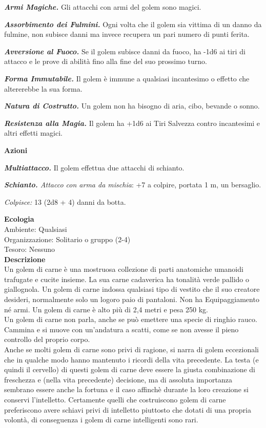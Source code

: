 \begin{multicols}{2}
\emph{\textbf{Armi Magiche.}} Gli attacchi con armi del golem sono magici.

\emph{\textbf{Assorbimento dei Fulmini.}} Ogni volta che il golem sia vittima di un danno da fulmine, non subisce danni ma invece recupera un pari numero di punti ferita.

\emph{\textbf{Avversione al Fuoco.}} Se il golem subisce danni da fuoco, ha -1d6 ai tiri di attacco e le prove di abilità fino alla fine del suo prossimo turno.

\emph{\textbf{Forma Immutabile.}} Il golem è immune a qualsiasi incantesimo o effetto che altererebbe la sua forma.

\emph{\textbf{Natura di Costrutto.}} Un golem non ha bisogno di aria, cibo, bevande o sonno.

\emph{\textbf{Resistenza alla Magia.}} Il golem ha +1d6 ai Tiri Salvezza contro incantesimi e altri effetti magici.

\textbf{Azioni}

\emph{\textbf{Multiattacco.}} Il golem effettua due attacchi di
schianto.

\emph{\textbf{Schianto.} Attacco con arma da mischia}: +7 a colpire,
portata 1 m, un bersaglio.

\emph{Colpisce:} 13 (2d8 + 4) danni da botta.

\textbf{Ecologia}\\
Ambiente: Qualsiasi\\
Organizzazione: Solitario o gruppo (2-4)\\
Tesoro: Nessuno\\
\textbf{Descrizione}\\
Un golem di carne è una mostruosa collezione di parti anatomiche umanoidi trafugate e cucite insieme. La sua carne cadaverica ha tonalità verde pallido o giallognola. Un golem di carne indossa qualsiasi tipo di vestito che il suo creatore desideri, normalmente solo un logoro paio di pantaloni. Non ha Equipaggiamento né armi. Un golem di carne è alto più di 2,4 metri e pesa 250 kg.\\

Un golem di carne non parla, anche se può emettere una specie di ringhio rauco. Cammina e si muove con un'andatura a scatti, come se non avesse il pieno controllo del proprio corpo.\\

Anche se molti golem di carne sono privi di ragione, si narra di golem eccezionali che in qualche modo hanno mantenuto i ricordi della vita precedente. La testa (e quindi il cervello) di questi golem di carne deve essere la giusta combinazione di freschezza e (nella vita precedente) decisione, ma di assoluta importanza sembrano essere anche la fortuna e il caso affinchè durante la loro creazione si conservi l'intelletto. Certamente quelli che costruiscono golem di carne preferiscono avere schiavi privi di intelletto piuttosto che dotati di una propria volontà, di conseguenza i golem di carne intelligenti sono rari.\\




\end{multicols}
